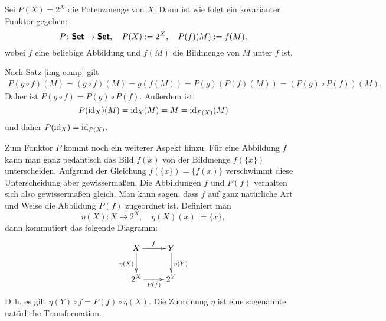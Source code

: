 \begin{Satz} Sei $P(X)=2^X$ die Potenzmenge von $X$. Dann ist
wie folgt ein kovarianter Funktor gegeben:
\[P\colon\textsf{\textbf{Set}}\to\textsf{\textbf{Set}},\quad
P(X):=2^X,\quad P(f)(M):=f(M),\]
wobei $f$ eine beliebige Abbildung
und $f(M)$ die Bildmenge von $M$ unter $f$ ist.
\end{Satz}
 Nach Satz \ref{img-comp} gilt
\begin{gather*}
P(g\circ f)(M) = (g\circ f)(M) = g(f(M))
= P(g)(P(f)(M)) = (P(g)\circ P(f))(M).
\end{gather*}
Daher ist $P(g\circ f)=P(g)\circ P(f)$. Außerdem ist
\[P(\operatorname{id}_X)(M) = \operatorname{id}_X(M) = M = \operatorname{id}_{P(X)}(M)\]
und daher $P(\operatorname{id}_X)=\operatorname{id}_{P(X)}$.\;\qedsymbol

Zum Funktor $P$ kommt noch ein weiterer Aspekt hinzu.
Für eine Abbildung $f$ kann man ganz pedantisch das
Bild $f(x)$ von der Bildmenge $f(\{x\})$ unterscheiden.
Aufgrund der Gleichung $f(\{x\})=\{f(x)\}$ verschwimmt diese
Unterscheidung aber gewissermaßen.
Die Abbildungen $f$ und $P(f)$ verhalten sich also
gewissermaßen gleich. Man kann sagen, dass $f$
auf ganz natürliche Art und Weise die Abbildung $P(f)$
zugeordnet ist. Definiert man
\[\eta(X)\colon X\to 2^X,\quad \eta(X)(x):=\{x\},\]
dann kommutiert das folgende Diagramm:
\[\xymatrix{
X \ar[r]^f \ar[d]_{\eta(X)} & Y \ar[d]^{\eta(Y)} \\
2^X \ar[r]_{P(f)} & 2^Y }\]
D.\,h. es gilt $\eta(Y)\circ f = P(f)\circ\eta(X)$.
Die Zuordnung $\eta$ ist eine sogenannte natürliche Transformation.

